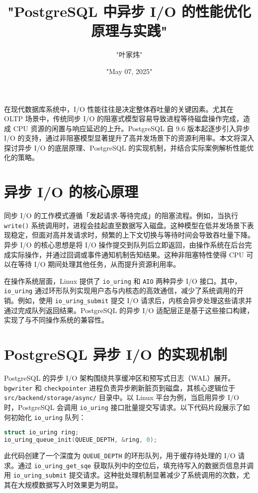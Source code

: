 \title{"PostgreSQL 中异步 I/O 的性能优化原理与实践"}
\author{"叶家炜"}
\date{"May 07, 2025"}
\maketitle
在现代数据库系统中，I/O 性能往往是决定整体吞吐量的关键因素。尤其在 OLTP 场景中，传统同步 I/O 的阻塞式模型容易导致进程等待磁盘操作完成，造成 CPU 资源的闲置与响应延迟的上升。PostgreSQL 自 9.6 版本起逐步引入异步 I/O 的支持，通过非阻塞模型显著提升了高并发场景下的资源利用率。本文将深入探讨异步 I/O 的底层原理、PostgreSQL 的实现机制，并结合实际案例解析性能优化的策略。\par
\chapter{异步 I/O 的核心原理}
同步 I/O 的工作模式遵循「发起请求-等待完成」的阻塞流程。例如，当执行 \verb!write()! 系统调用时，进程会挂起直至数据写入磁盘。这种模型在低并发场景下表现稳定，但面对高并发请求时，频繁的上下文切换与等待时间会导致吞吐量下降。异步 I/O 的核心思想是将 I/O 操作提交到队列后立即返回，由操作系统在后台完成实际操作，并通过回调或事件通知机制告知结果。这种非阻塞特性使得 CPU 可以在等待 I/O 期间处理其他任务，从而提升资源利用率。\par
在操作系统层面，Linux 提供了 \verb!io_uring! 和 \verb!AIO! 两种异步 I/O 接口。其中，\verb!io_uring! 通过环形队列实现用户态与内核态的高效通信，减少了系统调用的开销。例如，使用 \verb!io_uring_submit! 提交 I/O 请求后，内核会异步处理这些请求并通过完成队列返回结果。PostgreSQL 的异步 I/O 适配层正是基于这些接口构建，实现了与不同操作系统的兼容性。\par
\chapter{PostgreSQL 异步 I/O 的实现机制}
PostgreSQL 的异步 I/O 架构围绕共享缓冲区和预写式日志（WAL）展开。\verb!bgwriter! 和 \verb!checkpointer! 进程负责异步刷新脏页到磁盘，其核心逻辑位于 \verb!src/backend/storage/async/! 目录中。以 Linux 平台为例，当启用异步 I/O 时，PostgreSQL 会调用 \verb!io_uring! 接口批量提交写请求。以下代码片段展示了如何初始化 \verb!io_uring! 队列：\par
\begin{lstlisting}[language=c]
struct io_uring ring;
io_uring_queue_init(QUEUE_DEPTH, &ring, 0);
\end{lstlisting}
此代码创建了一个深度为 \verb!QUEUE_DEPTH! 的环形队列，用于缓存待处理的 I/O 请求。通过 \verb!io_uring_get_sqe! 获取队列中的空位后，填充待写入的数据页信息并调用 \verb!io_uring_submit! 提交请求。这种批处理机制显著减少了系统调用的次数，尤其在大规模数据写入时效果更为明显。\par
